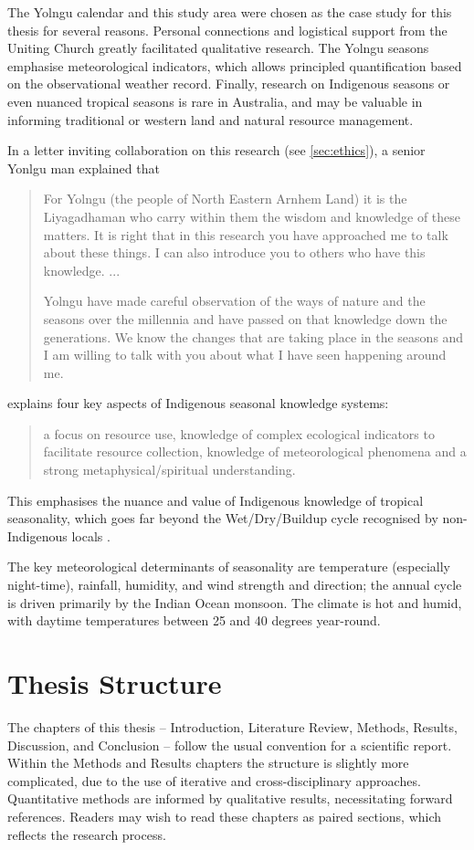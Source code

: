 The Yolngu calendar and this study area were chosen as the case study for
this thesis for several reasons.  Personal connections and logistical support
from the Uniting Church greatly facilitated qualitative research.  The
Yolngu seasons emphasise meteorological indicators, which allows principled
quantification based on the observational weather record.  Finally, research
on Indigenous seasons or even nuanced tropical seasons is rare in Australia,
and may be valuable in informing traditional or western land and natural
resource management.

In a letter inviting collaboration on this research (see \autoref{sec:ethics}),
a senior Yonlgu man explained that \blockquote{
    For Yolngu (the people of North Eastern Arnhem Land) it is the Liyagadhaman
    who carry within them the wisdom and knowledge of these matters.
    It is right that in this research you have approached me to talk about these
    things. I can also introduce you to others who have this knowledge.  ...

    Yolngu have made careful observation of the ways of nature and the seasons
    over the millennia and have passed on that knowledge down the generations.
    We know the changes that are taking place in the seasons and I am willing
    to talk with you about what I have seen happening around me.
}

\citet{woodward2012b} explains four key aspects of Indigenous seasonal
knowledge systems: \blockquote{
    a focus on resource use, knowledge of complex ecological indicators
    to facilitate resource collection, knowledge of meteorological
    phenomena and a strong metaphysical/spiritual understanding.}.
This emphasises the nuance and value of Indigenous knowledge of tropical
seasonality, which goes far beyond the Wet/Dry/Buildup cycle recognised
by non-Indigenous locals \citep{willmett2009}.

The key meteorological determinants of seasonality are temperature (especially
night-time), rainfall, humidity, and wind strength and direction; the annual
cycle is driven primarily by the Indian Ocean monsoon.  The climate is hot and
humid, with daytime temperatures between 25 and 40 degrees year-round.



\section{Thesis Structure}

The chapters of this thesis -- Introduction, Literature Review, Methods,
Results, Discussion, and Conclusion -- follow the usual convention for
a scientific report.  Within the Methods and Results chapters
the structure is slightly more complicated, due to the use of iterative and
cross-disciplinary approaches.  Quantitative methods are informed by
qualitative results, necessitating forward references.  Readers may wish
to read these chapters as paired sections, which reflects the research
process.\\


